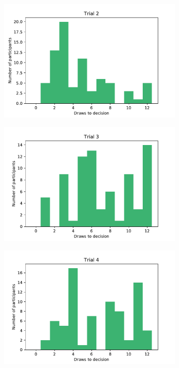 \begin{figure}
    \centering
    \begin{subfigure}{0.48\textwidth}
        \includegraphics[scale=0.36]{pictures/dtd2_histogram.pdf}
    \end{subfigure}
    \hfill
    \begin{subfigure}{0.48\textwidth}
        \includegraphics[scale=0.36]{pictures/dtd3_histogram.pdf}
    \end{subfigure}
    \vfill
    \begin{subfigure}{0.48\textwidth}
        \includegraphics[scale=0.36]{pictures/dtd4_histogram.pdf}

\end{subfigure}
\end{figure}
